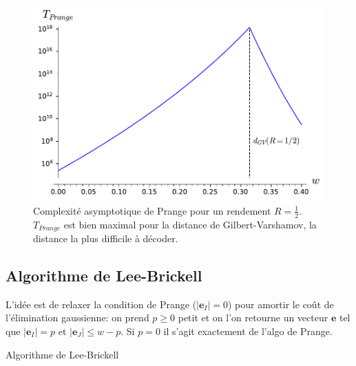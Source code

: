 \documentclass{scrartcl}[a4paper,9pt,headings=small,footinclude=false]
\theoremstyle{definition}
\theoremstyle{remark}
\begin{document}
\begin{figure}[h]
\centering
\includegraphics{decodage_syndrome/prange.pdf}
\caption{Complexité asymptotique de Prange pour un rendement $R=\frac{1}{2}$. $T_{Prange}$ est bien maximal pour la distance de Gilbert-Varshamov, la distance la plus difficile à décoder.}
\label{fig:prange}
\end{figure}


\subsection{Algorithme de Lee-Brickell}

L'idée est de relaxer la condition de Prange ($|\textbf{e}_I|=0$) pour amortir le coût de l'élimination gaussienne: on prend $p\geq 0$ petit et on l'on retourne un vecteur $\textbf{e}$ tel que $|\textbf{e}_I|=p$ et $|\textbf{e}_J|\leq w-p$. Si $p=0$ il s'agit exactement de l'algo de Prange.

\begin{algorithm}[H]
    \renewcommand{\algorithmcfname}{Algorithme}%
    \SetAlgoLined
\caption{Algorithme de Lee-Brickell}
\end{algorithm}
\end{document}
